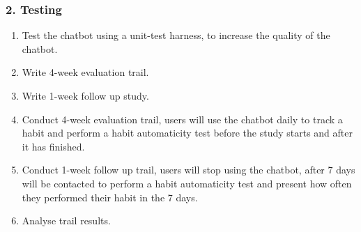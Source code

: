 \subsubsection*{2. Testing}

\begin{enumerate}
 \item Test the chatbot using a unit-test harness, to increase the quality of the chatbot.
 \item Write 4-week evaluation trail.
 \item Write 1-week follow up study.
 \item Conduct 4-week evaluation trail, users will use the chatbot daily to track a habit and perform a habit automaticity test before the study starts and after it has finished.
 \item Conduct 1-week follow up trail, users will stop using the chatbot, after 7 days will be contacted to perform a habit automaticity test and present how often they performed their habit in the 7 days.
 \item Analyse trail results.
\end{enumerate}

